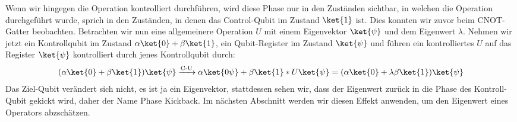 Wenn wir hingegen die Operation kontrolliert durchführen, wird diese Phase nur in den Zuständen sichtbar, in welchen die Operation durchgeführt wurde, sprich in den Zuständen, in denen das Control-Qubit im Zustand $\ket{1}$ ist. Dies konnten wir zuvor beim CNOT-Gatter beobachten. Betrachten wir nun eine allgemeinere Operation $U$ mit einem Eigenvektor $\ket{\psi}$ und dem Eigenwert $\lambda$. Nehmen wir jetzt ein Kontrollqubit im Zustand $\alpha\ket{0} + \beta\ket{1}$, ein Qubit-Register im Zustand $\ket{\psi}$ und führen ein kontrolliertes $U$ auf das Register $\ket{\psi}$ kontrolliert durch jenes Kontrollqubit durch:
\begin{align*}
(\alpha\ket{0} + \beta\ket{1})\ket{\psi} \xrightarrow{\text{C-U}} \alpha\ket{0\psi} + \beta\ket{1}*U\ket{\psi} = (\alpha\ket{0} + \lambda\beta\ket{1})\ket{\psi}
\end{align*}
Das Ziel-Qubit verändert sich nicht, es ist ja ein Eigenvektor, stattdessen sehen wir, dass der Eigenwert zurück in die Phase des Kontroll-Qubit \grqq gekickt\grqq{} wird, daher der Name Phase Kickback. Im nächsten Abschnitt werden wir diesen Effekt anwenden, um den Eigenwert eines Operators abzschätzen.

